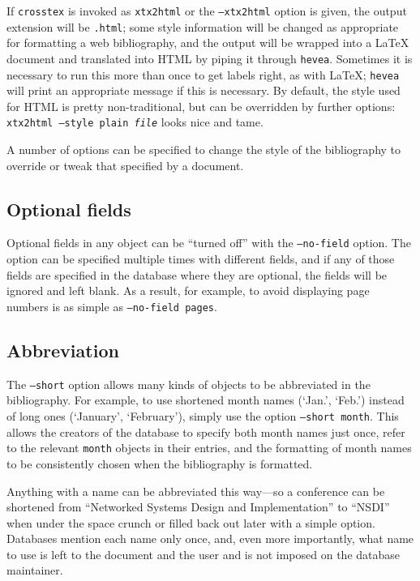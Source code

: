 \documentclass{article}
\begin{document}
If \texttt{crosstex} is invoked as \texttt{xtx2html} or the
\texttt{--xtx2html} option is given, the output extension will be
\texttt{.html}; some style information will be changed as appropriate
for formatting a web bibliography, and the output will be wrapped
into a \LaTeX{} document and translated into HTML by piping it through
\texttt{hevea}. Sometimes it is necessary to run this more than once
to get labels right, as with \LaTeX{}; \texttt{hevea} will print an
appropriate message if this is necessary. By default, the style used
for HTML is pretty non-traditional, but can be overridden by further
options: \texttt{xtx2html --style plain \textrm{\textit{file}}} looks
nice and tame.

A number of options can be specified to change the style of the
bibliography to override or tweak that specified by a document.

\subsection{Optional fields}

Optional fields in any object can be ``turned off'' with the
\texttt{--no-field} option.  The option can be specified multiple
times with different fields, and if any of those fields are specified
in the database where they are optional, the fields will be ignored and
left blank.  As a result, for example, to avoid displaying page numbers
is as simple as \texttt{--no-field pages}.

\subsection{Abbreviation}

The \texttt{--short} option allows many kinds of objects to be abbreviated
in the bibliography. For example, to use shortened month names (`Jan.',
`Feb.') instead of long ones (`January', `February'), simply use
the option \texttt{--short month}. This allows the creators of the
database to specify both month names just once, refer to the relevant
\texttt{month} objects in their entries, and the formatting of month
names to be consistently chosen when the bibliography is formatted.

Anything with a name can be abbreviated this way---so a conference can
be shortened from ``Networked Systems Design and Implementation'' to
``NSDI'' when under the space crunch or filled back out later with a
simple option. Databases mention each name only once, and, even more
importantly, what name to use is left to the document and the user and
is not imposed on the database maintainer.
\end{document}
